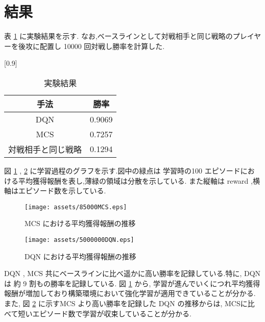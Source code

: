 \documentclass[twocolumn]{jarticle}     %
\begin{document}
\section{結果}
表 \ref{table:result} に実験結果を示す. なお,ベースラインとして対戦相手と同じ戦略のプレイヤーを後攻に配置し 10000 回対戦し勝率を計算した.
\begin{table}[H]
  \centering
  \caption{実験結果}
  \label{table:result}
  \scalebox{0.9}[0.9]{
    \begin{tabular}{|c|c|}
      \hline
      手法 & 勝率 \\ \hline \hline
      DQN & 0.9069 \\ \hline
      MCS & 0.7257 \\ \hline     
      対戦相手と同じ戦略 & 0.1294 \\ \hline

      \end{tabular}
  }
  \end{table}

  図 \ref{fig:MCSresult} , \ref{fig:DQNresult} に学習過程のグラフを示す.図中の緑点は 学習時の100 エピソードにおける平均獲得報酬を表し,薄緑の領域は分散を示している.
  また縦軸は reward ,横軸はエピソード数を示している. 

  \begin{figure}[H]
    \centering
    \texttt{[image: assets/85000MCS.eps]}
    \caption{MCS における平均獲得報酬の推移}
    \label{fig:MCSresult}
  \end{figure}

  \begin{figure}[H]
    \centering
    \texttt{[image: assets/5000000DQN.eps]}
    \caption{DQN における平均獲得報酬の推移}
    \label{fig:DQNresult}
  \end{figure}
DQN , MCS 共にベースラインに比べ遥かに高い勝率を記録している.特に, DQN は 約 9 割もの勝率を記録している.
図 \ref{fig:MCSresult} から, 学習が進んでいくにつれ平均獲得報酬が増加しており構築環境において強化学習が適用できていることが分かる.
また, 図 \ref{fig:DQNresult} に示すMCS より高い勝率を記録した DQN の推移からは, MCSに比べて短いエピソード数で学習が収束していることが分かる.
  
\end{document}
